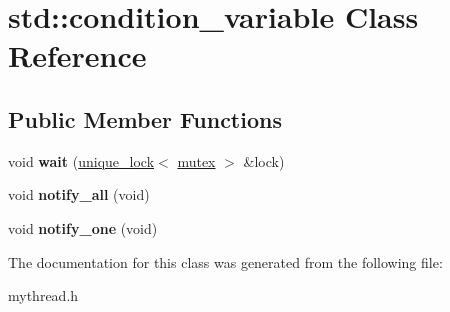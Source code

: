 \hypertarget{classstd_1_1condition__variable}{\section{std\-:\-:condition\-\_\-variable \-Class \-Reference}
\label{classstd_1_1condition__variable}
}
\subsection*{\-Public \-Member \-Functions}
\begin{DoxyCompactItemize}
\item 
\hypertarget{classstd_1_1condition__variable_aac6917dec618a858a9c10dac6c858bf2}{void {\bfseries wait} (\hyperlink{classstd_1_1unique__lock}{unique\-\_\-lock}$<$ \hyperlink{classstd_1_1mutex}{mutex} $>$ \&lock)}\label{classstd_1_1condition__variable_aac6917dec618a858a9c10dac6c858bf2}

\item 
\hypertarget{classstd_1_1condition__variable_a543f0f32e56ccac6d758e6fa668581d5}{void {\bfseries notify\-\_\-all} (void)}\label{classstd_1_1condition__variable_a543f0f32e56ccac6d758e6fa668581d5}

\item 
\hypertarget{classstd_1_1condition__variable_a4942d1d35b1259eb35773b604e0be20a}{void {\bfseries notify\-\_\-one} (void)}\label{classstd_1_1condition__variable_a4942d1d35b1259eb35773b604e0be20a}

\end{DoxyCompactItemize}


\-The documentation for this class was generated from the following file\-:\begin{DoxyCompactItemize}
\item 
mythread.\-h\end{DoxyCompactItemize}
